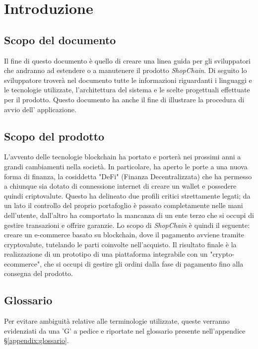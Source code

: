 

\section{Introduzione} \label{section:introduzione}
\subsection{Scopo del documento}
Il fine di questo documento è quello di creare una linea guida per gli sviluppatori che andranno ad estendere o a manutenere il prodotto \textit{ShopChain}.
Di seguito lo sviluppatore troverà nel documento tutte le informazioni riguardanti i linguaggi e le tecnologie utilizzate, l'architettura del sistema e le scelte progettuali effettuate per il prodotto.
Questo documento ha anche il fine di illustrare la procedura di avvio dell' applicazione.
\subsection{Scopo del prodotto}
L'avvento delle tecnologie blockchain\glo{} ha portato e porterà nei prossimi anni a grandi cambiamenti nella società.
In particolare, ha aperto le porte a una nuova forma di finanza, la cosiddetta "DeFi" (Finanza Decentralizzata) che ha permesso a chiunque sia dotato di connessione internet di creare un wallet\glo{} e possedere quindi criptovalute\glo{}.
Questo ha delineato due profili critici strettamente legati; da un lato il controllo del proprio portafoglio è passato completamente nelle mani dell'utente, dall'altro ha comportato la mancanza di un ente terzo che si occupi di gestire transazioni e offrire garanzie.
\newline
Lo scopo di \textit{ShopChain} è quindi il seguente: creare un e-commerce\glo{} basato su blockchain\glo{}, dove il pagamento avviene tramite cryptovalute\glo{}, tutelando le parti coinvolte nell'acquisto.
\newline
Il risultato finale è la realizzazione di un prototipo di una piattaforma integrabile con un "crypto-ecommerce\glo{}", che si occupi di gestire gli ordini dalla fase di pagamento fino alla consegna del prodotto.

\subsection{Glossario}
Per evitare ambiguità relative alle terminologie utilizzate, queste verranno evidenziati da una 'G' a pedice e riportate nel glossario presente nell'appendice §\ref{appendix:glossario}.
